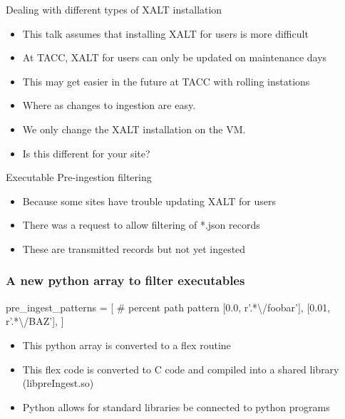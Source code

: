 \documentclass{beamer}
\begin{document}
\begin{frame}{Dealing with different types of XALT installation}
  \begin{itemize}
    \item This talk assumes that installing XALT for users is more
      difficult
    \item At TACC, XALT for users can only be updated on maintenance days 
    \item This may get easier in the future at TACC with rolling instations
    \item Where as changes to ingestion are easy.
    \item We only change the XALT installation on the VM.
    \item Is this different for your site?
  \end{itemize}
\end{frame}

\begin{frame}{Executable Pre-ingestion filtering}
  \begin{itemize}
    \item Because some sites have trouble updating XALT for users
    \item There was a request to allow filtering of *.json records 
    \item These are transmitted records but not yet ingested
  \end{itemize}
\end{frame}

\begin{frame}[fragile]
    \frametitle{A new python array to filter executables}
 {\small
    \begin{semiverbatim}
pre_ingest_patterns = [
#   percent   path pattern
    [0.0,     r'.*\textbackslash{}/foobar'],
    [0.01,    r'.*\textbackslash{}/BAZ'],
]
    \end{semiverbatim}
 }
  \begin{itemize}
    \item This python array is converted to a flex routine
    \item This flex code is converted to C code and compiled into a
      shared library (libpreIngest.so)
    \item Python allows for standard libraries be connected to python programs
  \end{itemize}
\end{frame}
\end{document}
